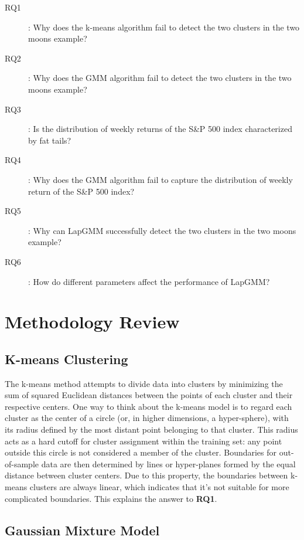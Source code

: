 \documentclass[10pt,journal,compsoc]{IEEEtran}
\begin{document}
\begin{description}
    \item[RQ1]: Why does the k-means algorithm fail to detect the two clusters in the two moons example?
    \item[RQ2]: Why does the GMM algorithm fail to detect the two clusters in the two moons example?
    \item[RQ3]: Is the distribution of weekly returns of the S\&P 500 index characterized by fat tails?
    \item[RQ4]: Why does the GMM algorithm fail to capture the distribution of weekly return of the S\&P 500 index?
    \item[RQ5]: Why can LapGMM successfully detect the two clusters in the two moons example?
    \item[RQ6]: How do different parameters affect the performance of LapGMM?
\end{description}

\section{Methodology Review}\label{sec:methodology}

    \subsection{K-means Clustering}
    
    The k-means method attempts to divide data into clusters by minimizing the sum of squared Euclidean distances between the points of each cluster and their respective centers. One way to think about the k-means model is to regard each cluster as the center of a circle (or, in higher dimensions, a hyper-sphere), with its radius defined by the most distant point belonging to that cluster. This radius acts as a hard cutoff for cluster assignment within the training set: any point outside this circle is not considered a member of the cluster. Boundaries for out-of-sample data are then determined by lines or hyper-planes formed by the equal distance between cluster centers. Due to this property, the boundaries between k-means clusters are always linear, which indicates that it’s not suitable for more complicated boundaries. This explains the answer to \textbf{RQ1}.

    \subsection{Gaussian Mixture Model}
    
\end{document}

